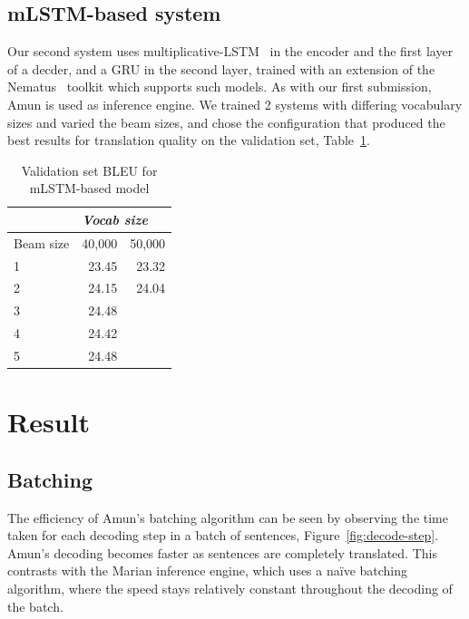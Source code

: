 \documentclass[11pt,a4paper]{article}
\begin{document}
\subsection{mLSTM-based system}

Our second system uses multiplicative-LSTM~\citep{krause2017} in the encoder and the first layer of a decder, and a GRU in the second layer, trained with an extension of the Nematus~\citep{sennrich-EtAl:2017:EACLDemo} toolkit which supports such models. 
As with our first submission, Amun is used as inference engine.
We trained 2 systems with differing vocabulary sizes and varied the beam sizes, and chose the configuration that produced the best results for translation quality on the validation set, Table~\ref{tab:mLSTM BLEU - vocab sizes}. 

\begin{table}
\begin{center}
\begin{tabular}{|l|r|r|} \hline
		& \multicolumn{2}{|l|}{\emph{Vocab size}}	\\ \hline	
Beam size	& 40,000	& 50,000 \\ \hline
1 		& 23.45		& 23.32	\\ 
2		& 24.15		& 24.04	\\
3		& 24.48		&  	\\
4		& 24.42		& 	\\
5		& 24.48		& 	\\ \hline
\end{tabular}
\end{center}
\caption{Validation set BLEU for mLSTM-based model}
\label{tab:mLSTM BLEU - vocab sizes}
\end{table}

\section{Result}
\label{sec:Result}

\subsection{Batching}

The efficiency of Amun's batching algorithm can be seen by observing the time taken for each decoding step in a batch of sentences, Figure~\ref{fig:decode-step}. Amun's decoding becomes faster as sentences are completely translated. This contrasts with the Marian inference engine, which uses a na\"ive batching algorithm, where the speed stays relatively constant throughout the decoding of the batch.
\end{document}
